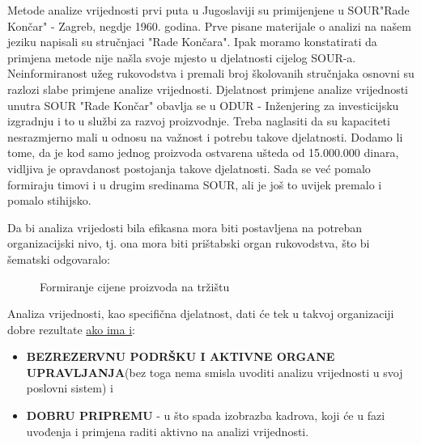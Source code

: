 \documentclass[a4paper,12pt]{article}
\numberwithin{figure}{section}
\begin{document}
Metode analize vrijednosti prvi puta u Jugoslaviji su primijenjene u SOUR"Rade Končar" - Zagreb, negdje 1960. godina. Prve pisane materijale o analizi na našem jeziku napisali su stručnjaci "Rade Končara". Ipak moramo konstatirati da primjena metode nije našla svoje mjesto u djelatnosti cijelog SOUR-a. Neinformiranost užeg rukovodstva i premali broj školovanih stručnjaka osnovni su razlozi slabe primjene analize vrijednosti. Djelatnost primjene analize vrijednosti unutra SOUR "Rade Končar" obavlja se u ODUR - Inženjering za investicijsku izgradnju i to u službi za razvoj proizvodnje. Treba naglasiti da su kapaciteti nesrazmjerno mali u odnosu na važnost i potrebu takove djelatnosti. Dodamo li tome, da je kod samo jednog proizvoda ostvarena ušteda od 15.000.000 dinara, vidljiva je opravdanost postojanja takove djelatnosti. Sada se već pomalo formiraju timovi i u drugim sredinama SOUR, ali je još to uvijek premalo i pomalo stihijsko. \par
Da bi analiza vrijedosti bila efikasna mora biti postavljena na potreban organizacijski nivo, tj. ona mora biti prištabski organ rukovodstva, što bi šematski odgovaralo:
\begin{figure}[!h]
\centering
 
\caption{Formiranje cijene proizvoda na tržištu}\label{Slika2}
\end{figure}
\FloatBarrier
Analiza vrijednosti, kao specifična djelatnost, dati će tek u takvoj organizaciji dobre rezultate \underline{ako ima i}:
\begin{itemize}
\item \textbf{BEZREZERVNU PODRŠKU I AKTIVNE ORGANE UPRAVLJANJA}(bez toga nema smisla uvoditi analizu vrijednosti u svoj poslovni sistem) i
\item \textbf{DOBRU PRIPREMU} - u što spada izobrazba kadrova, koji će u fazi uvođenja i primjena raditi aktivno na analizi vrijednosti.
\end{itemize}
\newpage
\end{document}

